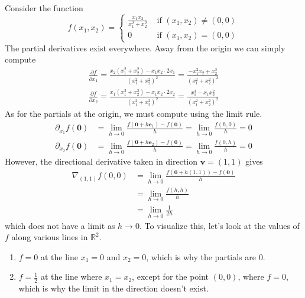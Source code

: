   \begin{example}
    Consider the function 
    \[f(x_1, x_2) = \begin{cases} 
    \frac{x_1 x_2}{x_1^2 + x_2^2} & \text{ if } (x_1, x_2) \neq (0, 0) \\
    0 & \text{ if } (x_1, x_2) = (0, 0) 
    \end{cases}\]
    The partial derivatives exist everywhere. Away from the origin we can simply compute 
    \begin{align*}
        \frac{\partial f}{\partial x_1} = \frac{x_2 (x_1^2 + x_2^2) - x_1 x_2 \cdot 2x_1}{(x_1^2 + x_2^2)^2} = \frac{- x_1^2 x_2 + x_2^3}{(x_1^2 + x_2^2)^2} \\
        \frac{\partial f}{\partial x_2} = \frac{x_1 (x_1^2 + x_2^2) - x_1 x_2 \cdot 2 x_2}{(x_1^2 + x_2^2)^2} = \frac{x_1^3 - x_1 x_2^2}{(x_1^2 + x_2^2)^2}
    \end{align*}
    As for the partials at the origin, we must compute using the limit rule. 
    \begin{align*}
        \partial_{x_1} f (\mathbf{0}) & = \lim_{h \rightarrow 0} \frac{f(\mathbf{0} + h \mathbf{e}_1) - f(\mathbf{0})}{h} = \lim_{h \rightarrow 0} \frac{f(h, 0)}{h} = 0  \\
        \partial_{x_2} f (\mathbf{0}) & = \lim_{h \rightarrow 0} \frac{f(\mathbf{0} + h \mathbf{e}_2) - f(\mathbf{0})}{h} = \lim_{h \rightarrow 0} \frac{f(0, h)}{h} = 0
    \end{align*}
    However, the directional derivative taken in direction $\mathbf{v} = (1, 1)$ gives 
    \begin{align*}
        \nabla_{(1, 1)} f (0, 0) & = \lim_{h \rightarrow 0} \frac{f(\mathbf{0} + h (1, 1)) - f(\mathbf{0})}{h} \\
        & = \lim_{h \rightarrow 0} \frac{f(h, h)}{h} \\
        & = \lim_{h \rightarrow 0} \frac{1}{2h} 
    \end{align*}
    which does not have a limit as $h \rightarrow 0$. To visualize this, let's look at the values of $f$ along various lines in $\mathbb{R}^2$. 
    \begin{enumerate}
        \item $f = 0$ at the line $x_1 = 0$ and $x_2 = 0$, which is why the partials are $0$. 
        \item $f = \frac{1}{2}$ at the line where $x_1 = x_2$, except for the point $(0, 0)$, where $f = 0$, which is why the limit in the direction doesn't exist. 
    \end{enumerate}
  \end{example}

